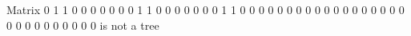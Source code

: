 \documentclass{article}
\begin{document}
Matrix
0 1 1 0 0 0 0
0 0 0 1 1 0 0
0 0 0 0 0 1 1
0 0 0 0 0 0 0
0 0 0 0 0 0 0
0 0 0 0 0 0 0
0 0 0 0 0 0 0
is not a tree
\end{document}
